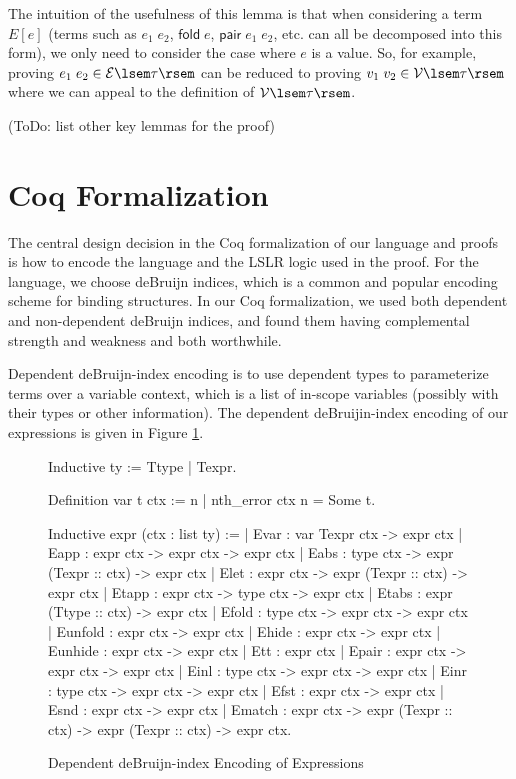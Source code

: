 \documentclass[preprint]{sigplanconf}
\newcommand{\symfold}{\mathsf{fold\;}}
\newcommand{\sympair}{\mathsf{pair}}
\newcommand{\relV}[1]{\mathcal{V}\lsem#1\rsem}
\newcommand{\relE}[1]{\mathcal{E}\lsem#1\rsem}
\begin{document}
The intuition of the usefulness of this lemma is that when considering a term $E[e]$ (terms such as $e_1\;e_2$, $\symfold e$, $\sympair\;e_1\;e_2$, etc. can all be decomposed into this form), we only need to consider the case where $e$ is a value. So, for example, proving $e_1\;e_2\in\relE{\tau}$ can be reduced to proving $v_1\;v_2\in\relV{\tau}$ where we can appeal to the definition of $\relV{\tau}$.

(ToDo: list other key lemmas for the proof)

\section{\label{section-coq}Coq Formalization}

The central design decision in the Coq formalization of our language and proofs is how to encode the language and the LSLR logic used in the proof. For the language, we choose deBruijn indices, which is a common and popular encoding scheme for binding structures. In our Coq formalization, we used both dependent and non-dependent deBruijn indices, and found them having complemental strength and weakness and both worthwhile.

Dependent deBruijn-index encoding is to use dependent types to parameterize terms over a variable context, which is a list of in-scope variables (possibly with their types or other information). The dependent deBruijin-index encoding of our expressions is given in Figure \ref{coq-depdeb}.

\begin{figure}
\begin{coq}
Inductive ty := Ttype | Texpr.

Definition var t ctx := {n | nth_error ctx n = Some t}.

Inductive expr (ctx : list ty) :=
| Evar : var Texpr ctx -> expr ctx
| Eapp : expr ctx -> expr ctx -> expr ctx
| Eabs : type ctx -> expr (Texpr :: ctx) -> expr ctx
| Elet : expr ctx -> expr (Texpr :: ctx) -> expr ctx
| Etapp : expr ctx -> type ctx -> expr ctx
| Etabs : expr (Ttype :: ctx) -> expr ctx
| Efold : type ctx -> expr ctx -> expr ctx
| Eunfold : expr ctx -> expr ctx
| Ehide : expr ctx -> expr ctx
| Eunhide : expr ctx -> expr ctx
| Ett : expr ctx
| Epair : expr ctx -> expr ctx -> expr ctx
| Einl : type ctx -> expr ctx -> expr ctx
| Einr : type ctx -> expr ctx -> expr ctx
| Efst : expr ctx -> expr ctx
| Esnd : expr ctx -> expr ctx
| Ematch : expr ctx -> expr (Texpr :: ctx) -> expr (Texpr :: ctx) -> expr ctx.
\end{coq}
\caption{\label{coq-depdeb}Dependent deBruijn-index Encoding of Expressions}
\end{figure}
\end{document}

